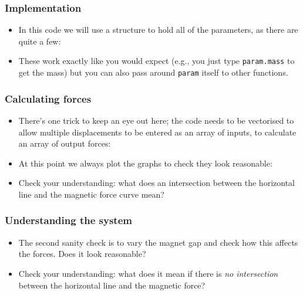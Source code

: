 \documentclass[9pt]{beamer-control}
\begin{document}
\begin{frame}
\frametitle{Implementation}

\begin{itemize}
\item In this code we will use a structure to hold all of the parameters, as there are quite a few:
\end{itemize}


\begin{itemize}
\item These work exactly like you would expect (e.g., you just type \texttt{param.mass} to get the mass) but you can also pass around \texttt{param} itself to other functions.
\end{itemize}

\end{frame}

\begin{frame}

\frametitle{Calculating forces}

\begin{itemize}
\item There's one trick to keep an eye out here; the code needs to be vectorised to allow multiple displacements to be entered as an array of inputs, to calculate an array of  output forces:
\end{itemize}


\begin{itemize}
\item At this point we always plot the graphs to check they look reasonable:
\end{itemize}


\begin{itemize}
\item Check your understanding: what does an intersection between the horizontal line and the magnetic force curve mean?
\end{itemize}

\end{frame}

\begin{frame}
\frametitle{Understanding the system}

\begin{itemize}
\item The second sanity check is to vary the magnet gap and check how this affects the forces. Does it look reasonable?
\end{itemize}


\begin{itemize}
\item Check your understanding: what does it mean if there is \emph{no intersection} between the horizontal line and the magnetic force?
\end{itemize}

\end{frame}
\end{document}
